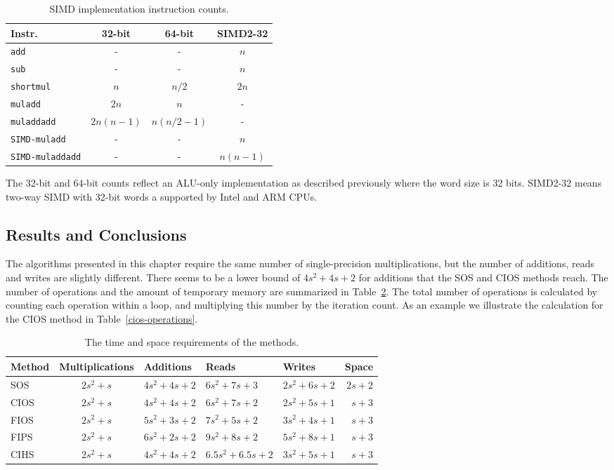 \documentclass[twocolumn]{svjour3}          %
\begin{document}
\begin{table}
\caption{SIMD implementation instruction counts.}
\label{simdCounts}
\begin{tabular}{|l||c|c|c|} \hline
Instr. & 32-bit & 64-bit & SIMD2-32 \\
\hline\hline
\texttt{add} & - & - & $n$ \\
\texttt{sub} & - & - & $n$ \\
\texttt{shortmul} & $n$ & $n/2$ & $2n$ \\
\texttt{muladd} & $2n$ & $n$ & - \\
\texttt{muladdadd} & $2n(n-1)$ & $n(n/2-1)$ & - \\
\texttt{SIMD-muladd} & - & - & $n$ \\
\texttt{SIMD-muladdadd} & - & - & $n(n-1)$ \\
\hline
\end{tabular}
\end{table}
%
\noindent
The 32-bit and 64-bit counts reflect an ALU-only implementation as described previously where the word size is 32 bits.
SIMD2-32 means two-way SIMD with 32-bit words a supported by Intel and ARM CPUs.

\subsection{Results and Conclusions}
\label{conclusion}

The algorithms presented in this chapter require the same number of
single-precision multiplications, but the number of additions,
reads and writes are slightly different.  There seems to be a lower
bound of $4s^2+4s+2$ for additions that the SOS and CIOS
methods reach.  The number of operations and the
amount of temporary memory  are summarized in
Table~\ref{requirements}. The total number of operations is
calculated by counting each operation within a loop, and multiplying
this number by the iteration count. As an example we illustrate the
calculation for the CIOS method in Table~\ref{cios-operations}.

\begin{table}
\caption{The time and space requirements of the methods.}
\label{requirements}
\begin{tabular}{|l||c|l|l|l||r|} \hline
Method & Multiplications & Additions & Reads & Writes & Space \\
\hline\hline
SOS    & $2s^2+s$ & $4s^2+4s+2$ & $6s^2+7s+3$ & $2s^2+6s+2$ & $2s+2$ \\
CIOS   & $2s^2+s$ & $4s^2+4s+2$ & $6s^2+7s+2$ & $2s^2+5s+1$ & $s+3$ \\
FIOS   & $2s^2+s$ & $5s^2+3s+2$ & $7s^2+5s+2$ & $3s^2+4s+1$ & $s+3$ \\
FIPS   & $2s^2+s$ & $6s^2+2s+2$ & $9s^2+8s+2$ & $5s^2+8s+1$ & $s+3$ \\
CIHS   & $2s^2+s$ & $4s^2+4s+2$ & $6.5s^2+6.5s+2$ & $3s^2+5s+1$ & $s+3$ \\
\hline
\end{tabular}
\end{table}
\end{document}
